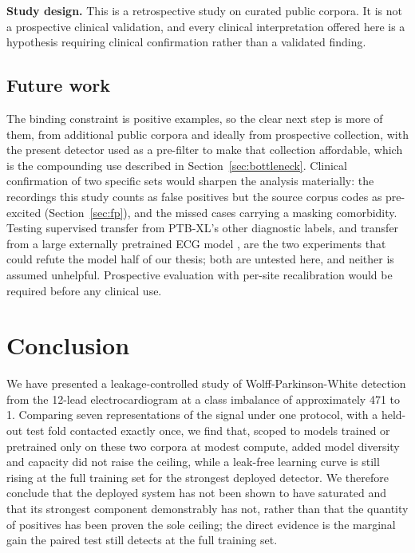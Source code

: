 \documentclass[11pt]{article}
\begin{document}
\textbf{Study design.} This is a retrospective study on curated public corpora. It is not a prospective clinical validation, and every clinical interpretation offered here is a hypothesis requiring clinical confirmation rather than a validated finding.

\subsection{Future work}

The binding constraint is positive examples, so the clear next step is more of them, from additional public corpora and ideally from prospective collection, with the present detector used as a pre-filter to make that collection affordable, which is the compounding use described in Section~\ref{sec:bottleneck}. Clinical confirmation of two specific sets would sharpen the analysis materially: the recordings this study counts as false positives but the source corpus codes as pre-excited (Section~\ref{sec:fp}), and the missed cases carrying a masking comorbidity. Testing supervised transfer from PTB-XL's other diagnostic labels, and transfer from a large externally pretrained ECG model \cite{ecgfm,hubert}, are the two experiments that could refute the model half of our thesis; both are untested here, and neither is assumed unhelpful. Prospective evaluation with per-site recalibration would be required before any clinical use.

\FloatBarrier
\section{Conclusion}

We have presented a leakage-controlled study of Wolff-Parkinson-White detection from the 12-lead electrocardiogram at a class imbalance of approximately 471 to 1. Comparing seven representations of the signal under one protocol, with a held-out test fold contacted exactly once, we find that, scoped to models trained or pretrained only on these two corpora at modest compute, added model diversity and capacity did not raise the ceiling, while a leak-free learning curve is still rising at the full training set for the strongest deployed detector. We therefore conclude that the deployed system has not been shown to have saturated and that its strongest component demonstrably has not, rather than that the quantity of positives has been proven the sole ceiling; the direct evidence is the marginal gain the paired test still detects at the full training set.
\end{document}
